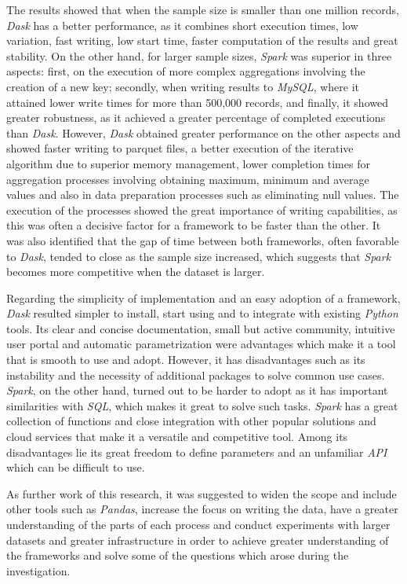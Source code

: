 \documentclass[11pt, oneside]{book}
\begin{document}
The results showed that when the sample size is smaller than one million records, \textit{Dask} has a better performance, as it combines short execution times, low variation, fast writing, low start time, faster computation of the results and great stability. On the other hand, for larger sample sizes, \textit{Spark} was superior in three aspects: first, on the execution of more complex aggregations involving the creation of a new key; secondly, when writing results to \textit{MySQL}, where it attained lower write times for more than 500,000 records, and finally, it showed greater robustness, as it achieved a greater percentage of completed executions than \textit{Dask}. However, \textit{Dask} obtained greater performance on the other aspects and showed faster writing to parquet files, a better execution of the iterative algorithm due to superior memory management, lower completion times for aggregation processes involving obtaining maximum, minimum and average values and also in data preparation processes such as eliminating null values. The execution of the processes showed the great importance of writing capabilities, as this was often a decisive factor for a framework to be faster than the other. It was also identified that the gap of time between both frameworks, often favorable to \textit{Dask}, tended to close as the sample size increased, which suggests that \textit{Spark} becomes more competitive when the dataset is larger. 

Regarding the simplicity of implementation and an easy adoption of a framework, \textit{Dask} resulted simpler to install, start using and to integrate with existing \textit{Python} tools. Its clear and concise documentation, small but active community, intuitive user portal and automatic parametrization were advantages which make it a tool that is smooth to use and adopt. However, it has disadvantages such as its instability and the necessity of additional packages to solve common use cases. \textit{Spark}, on the other hand, turned out to be harder to adopt as it has important similarities with \textit{SQL}, which makes it great to solve such tasks. \textit{Spark} has a  great collection of functions and close integration with other popular solutions and cloud services that make it a versatile and competitive tool. Among its disadvantages lie its great freedom to define parameters and an unfamiliar \textit{API} which can be difficult to use.

As further work of this research, it was suggested to widen the scope and include other tools such as \textit{Pandas}, increase the focus on writing the data, have a greater understanding of the parts of each process and conduct experiments with larger datasets and greater infrastructure in order to achieve greater understanding of the frameworks and solve some of the questions which arose during the investigation.
\end{document}
